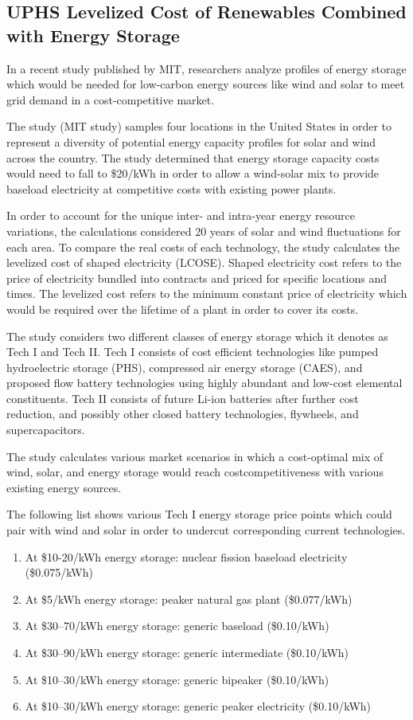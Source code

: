 \documentclass[hidelinks,12pt,a4paper]{article}
\begin{document}
\subsection{UPHS Levelized Cost of Renewables Combined with Energy Storage}
In a recent study published by MIT, researchers analyze profiles of energy storage which would be needed for low-carbon energy sources like wind and solar to meet grid demand in a cost-competitive market.

The study (MIT study) samples four locations in the United States in order to represent a diversity of potential energy capacity profiles for solar and wind across the country. The study determined that energy storage capacity costs would need to fall to \$20/kWh in order to allow a wind-solar mix to provide baseload electricity at competitive costs with existing power plants.

In order to account for the unique inter- and intra-year energy resource variations, the calculations considered 20 years of solar and wind fluctuations for each area. To compare the real costs of each technology, the study calculates the levelized cost of shaped electricity (LCOSE). Shaped electricity cost refers to the price of electricity bundled into contracts and priced for specific locations and times. The levelized cost refers to the minimum constant price of electricity which would be required over the lifetime of a plant in order to cover its costs.

The study considers two different classes of energy storage which it denotes as Tech I and Tech II. Tech I consists of cost efficient technologies like pumped hydroelectric storage (PHS), compressed air energy storage (CAES), and proposed flow battery technologies using highly abundant and low-cost elemental constituents. Tech II consists of future Li-ion batteries after further cost reduction, and possibly other closed battery technologies, flywheels, and supercapacitors. \cite{StorageRequirementsAndCostsOfShapingRenewableEnergy}

The study calculates various market scenarios in which a cost-optimal mix of wind, solar, and energy storage would reach costcompetitiveness with various existing energy sources.

The following list shows various Tech I energy storage price points which could pair with wind and solar in order to undercut corresponding current technologies.
{\footnotesize
\begin{enumerate}
    \item At \$10-20/kWh energy storage: nuclear fission baseload electricity (\$0.075/kWh)
    \item At \$5/kWh energy storage: peaker natural gas plant (\$0.077/kWh)
    \item At \$30–70/kWh energy storage: generic baseload (\$0.10/kWh)
    \item At \$30–90/kWh energy storage: generic intermediate (\$0.10/kWh)
    \item At \$10–30/kWh energy storage: generic bipeaker (\$0.10/kWh)
    \item At \$10–30/kWh energy storage: generic peaker electricity (\$0.10/kWh)
\end{enumerate}
}
\end{document}
